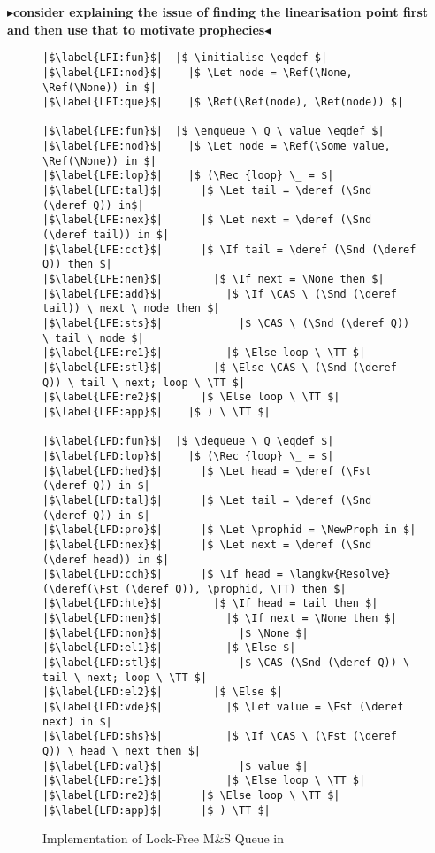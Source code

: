 \documentclass[a4paper, 10pt]{report}
\theoremstyle{definition}
\newcommand{\initialise}{\operatorname{initialize}}
\newcommand{\enqueue}{\operatorname{enqueue}}
\newcommand{\dequeue}{\operatorname{dequeue}}
\newcommand{\msq}{M\&S Queue}
\newcommand{\lfmsq}{Lock-Free \msq{}}
\newcommand{\todo}[1]{{\color[rgb]{.5,0,0}\textbf{$\blacktriangleright$#1$\blacktriangleleft$}}}
\begin{document}
\todo{consider explaining the issue of finding the linearisation point first and then use that to motivate prophecies}
\begin{figure}
\begin{verbatim}
|$\label{LFI:fun}$|  |$ \initialise \eqdef $|
|$\label{LFI:nod}$|    |$ \Let node = \Ref(\None, \Ref(\None)) in $|
|$\label{LFI:que}$|    |$ \Ref(\Ref(node), \Ref(node)) $|

|$\label{LFE:fun}$|  |$ \enqueue \ Q \ value \eqdef $|
|$\label{LFE:nod}$|    |$ \Let node = \Ref(\Some value, \Ref(\None)) in $|
|$\label{LFE:lop}$|    |$ (\Rec {loop} \_ = $|
|$\label{LFE:tal}$|      |$ \Let tail = \deref (\Snd (\deref Q)) in$|
|$\label{LFE:nex}$|      |$ \Let next = \deref (\Snd (\deref tail)) in $|
|$\label{LFE:cct}$|      |$ \If tail = \deref (\Snd (\deref Q)) then $|
|$\label{LFE:nen}$|        |$ \If next = \None then $|
|$\label{LFE:add}$|          |$ \If \CAS \ (\Snd (\deref tail)) \ next \ node then $|
|$\label{LFE:sts}$|            |$ \CAS \ (\Snd (\deref Q)) \ tail \ node $|
|$\label{LFE:re1}$|          |$ \Else loop \ \TT $|
|$\label{LFE:stl}$|        |$ \Else \CAS \ (\Snd (\deref Q)) \ tail \ next; loop \ \TT $|
|$\label{LFE:re2}$|      |$ \Else loop \ \TT $|
|$\label{LFE:app}$|    |$ ) \ \TT $|

|$\label{LFD:fun}$|  |$ \dequeue \ Q \eqdef $|
|$\label{LFD:lop}$|    |$ (\Rec {loop} \_ = $|
|$\label{LFD:hed}$|      |$ \Let head = \deref (\Fst (\deref Q)) in $|
|$\label{LFD:tal}$|      |$ \Let tail = \deref (\Snd (\deref Q)) in $|
|$\label{LFD:pro}$|      |$ \Let \prophid = \NewProph in $|
|$\label{LFD:nex}$|      |$ \Let next = \deref (\Snd (\deref head)) in $|
|$\label{LFD:cch}$|      |$ \If head = \langkw{Resolve} (\deref(\Fst (\deref Q)), \prophid, \TT) then $|
|$\label{LFD:hte}$|        |$ \If head = tail then $|
|$\label{LFD:nen}$|          |$ \If next = \None then $|
|$\label{LFD:non}$|            |$ \None $|
|$\label{LFD:el1}$|          |$ \Else $|
|$\label{LFD:stl}$|            |$ \CAS (\Snd (\deref Q)) \ tail \ next; loop \ \TT $|
|$\label{LFD:el2}$|        |$ \Else $|
|$\label{LFD:vde}$|          |$ \Let value = \Fst (\deref next) in $|
|$\label{LFD:shs}$|          |$ \If \CAS \ (\Fst (\deref Q)) \ head \ next then $|
|$\label{LFD:val}$|            |$ value $|
|$\label{LFD:re1}$|          |$ \Else loop \ \TT $|
|$\label{LFD:re2}$|      |$ \Else loop \ \TT $|
|$\label{LFD:app}$|      |$ ) \TT $|
\end{verbatim}
\caption{Implementation of \lfmsq{} in \heaplang}
\end{figure}
\end{document}
